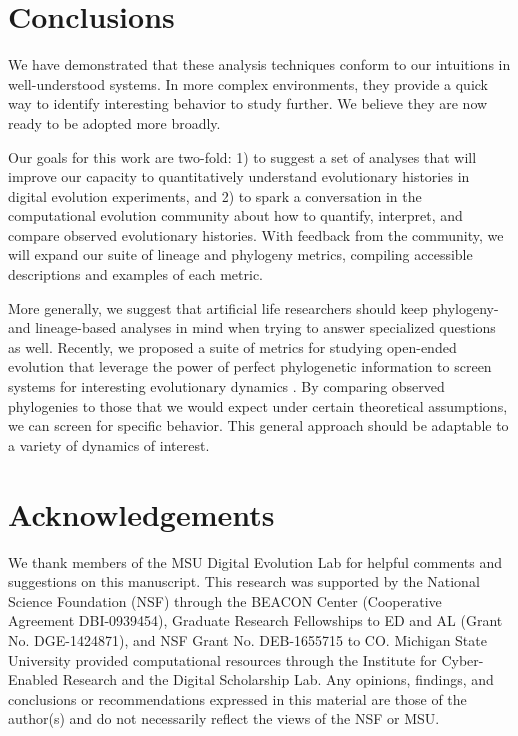 \documentclass[letterpaper]{article}
\begin{document}
\section{Conclusions}


We have demonstrated that these analysis techniques conform to our intuitions in well-understood systems. In more complex environments, they provide a quick way to identify interesting behavior to study further. We believe they are now ready to be adopted more broadly.

Our goals for this work are two-fold: 1) to suggest a set of analyses that will improve our capacity to quantitatively understand evolutionary histories in digital evolution experiments, and 2) to spark a conversation in the computational evolution community about how to quantify, interpret, and compare observed evolutionary histories. With feedback from the community, we will expand our suite of lineage and phylogeny metrics, compiling accessible descriptions and examples of each metric. 

More generally, we suggest that artificial life researchers should keep phylogeny- and lineage-based analyses in mind when trying to answer specialized questions as well. Recently, we proposed a suite of metrics for studying open-ended evolution that leverage the power of perfect phylogenetic information to screen systems for interesting evolutionary dynamics \citep{dolson_modes_2018}. By comparing observed phylogenies to those that we would expect under certain theoretical assumptions, we can screen for specific behavior. This general approach should be adaptable to a variety of dynamics of interest.

\section{Acknowledgements}

We thank members of the MSU Digital Evolution Lab for helpful comments and suggestions on this manuscript. This research was supported by the National Science Foundation (NSF) through the BEACON Center (Cooperative Agreement DBI-0939454), Graduate Research Fellowships to ED and AL (Grant No. DGE-1424871), and NSF Grant No. DEB-1655715 to CO. Michigan State University provided computational resources through the Institute for Cyber-Enabled Research and the Digital Scholarship Lab. Any opinions, findings, and conclusions or recommendations expressed in this material are those of the author(s) and do not necessarily reflect the views of the NSF or MSU.

\setlength{\bibsep}{2pt}

\footnotesize

\end{document}
